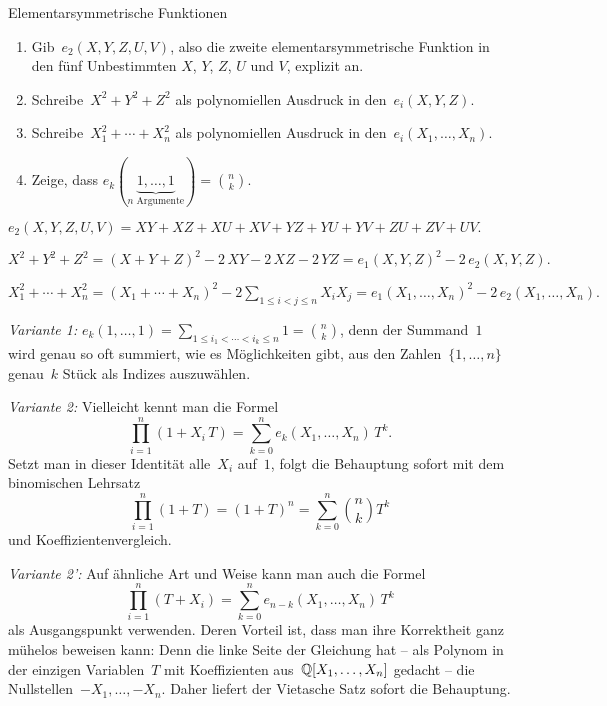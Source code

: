\documentclass{algblatt}
\begin{document}
\vspace*{-1.5cm}

\begin{aufgabe}{Elementarsymmetrische Funktionen}
\begin{enumerate}
\item Gib~$e_2(X,Y,Z,U,V)$, also
die zweite elementarsymmetrische Funktion in den fünf Unbestimmten
$X$, $Y$, $Z$, $U$ und $V$, explizit an.
\item Schreibe~$X^2 + Y^2 + Z^2$ als polynomiellen Ausdruck in den~$e_i(X,Y,Z)$.
\item Schreibe~$X_1^2 + \cdots + X_n^2$ als polynomiellen Ausdruck in
den~$e_i(X_1,\ldots,X_n)$.
\item Zeige, dass $e_k(\underbrace{1, \dots, 1}_{\text{$n$ Argumente}}) = \binom{n}{k}$.
\end{enumerate}
\begin{loesungE}
\item $e_2(X,Y,Z,U,V) = XY + XZ + XU + XV + YZ + YU + YV + ZU + ZV + UV.$
\item $X^2 + Y^2 + Z^2 = (X + Y + Z)^2 - 2\,XY - 2\,XZ - 2\,YZ =
e_1(X,Y,Z)^2 - 2\,e_2(X,Y,Z).$
\item $X_1^2 + \cdots + X_n^2 = (X_1 + \cdots + X_n)^2 -
2 \sum\limits_{1 \leq i < j \leq n} X_i X_j = e_1(X_1,\ldots,X_n)^2 -
2\,e_2(X_1,\ldots,X_n).$
\item \emph{Variante 1:} $e_k(1,\ldots,1) = \sum_{1 \leq i_1 < \cdots < i_k
\leq n} 1 = \binom{n}{k}$, denn der Summand~$1$ wird genau so oft summiert, wie
es Möglichkeiten gibt, aus den Zahlen~$\{1,\ldots,n\}$ genau~$k$ Stück als
Indizes auszuwählen.

\emph{Variante 2:} Vielleicht kennt man die Formel
\[ \prod_{i=1}^n (1 + X_i\,T) = \sum_{k=0}^n e_k(X_1,\ldots,X_n) \, T^k. \]
Setzt man in dieser Identität alle~$X_i$ auf~$1$, folgt die Behauptung sofort
mit dem binomischen Lehrsatz
\[ \prod_{i=1}^n (1 + T) = (1 + T)^n = \sum_{k=0}^n \binom{n}{k} T^k \]
und Koeffizientenvergleich.

\emph{Variante 2':} Auf ähnliche Art und Weise kann man auch die Formel
\[ \prod_{i=1}^n (T + X_i) = \sum_{k=0}^n e_{n-k}(X_1,\ldots,X_n) \, T^k \]
als Ausgangspunkt verwenden. Deren Vorteil ist, dass man ihre Korrektheit ganz
mühelos beweisen kann: Denn die linke Seite der Gleichung hat -- als Polynom
in der einzigen Variablen~$T$ mit Koeffizienten aus~$\mathbb{Q}[X_1,\ldots,X_n]$
gedacht -- die Nullstellen~$-X_1,\ldots,-X_n$. Daher liefert der Vietasche Satz
sofort die Behauptung.


\end{loesungE}
\end{aufgabe}
\end{document}
